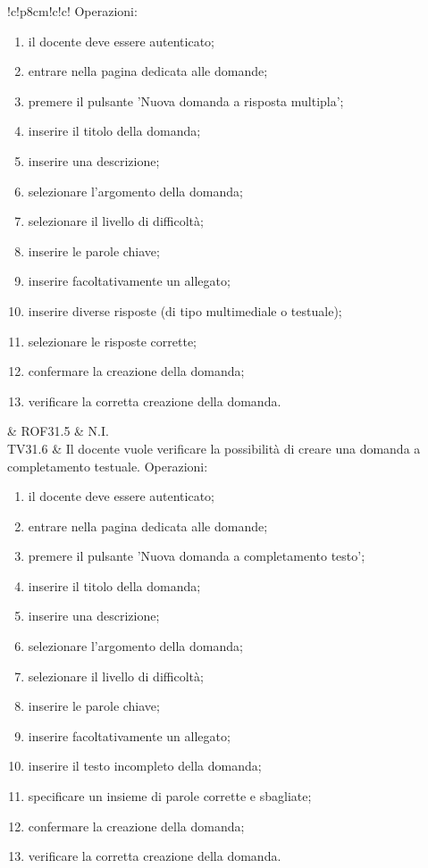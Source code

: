 \documentclass[a4paper, titlepage]{article}
\begin{document}
\begin{tabella}{!{\VRule}c!{\VRule}p{8cm}!{\VRule}c!{\VRule}c!{\VRule}}
		Operazioni:
		{\begin{enumerate}
				\item il docente deve essere autenticato;				  
				\item entrare nella pagina dedicata alle domande;
				\item premere il pulsante 'Nuova domanda a risposta multipla';
				\item inserire il titolo della domanda;
				\item inserire una descrizione;
				\item selezionare l’argomento della domanda;
				\item selezionare il livello di difficoltà;
				\item inserire le parole chiave;
				\item inserire facoltativamente un allegato;
				\item inserire diverse risposte (di tipo multimediale o testuale);
				\item selezionare le risposte corrette;
				\item confermare la creazione della domanda;
				\item verificare la corretta creazione della domanda.
		\end{enumerate}
		}
	& ROF31.5 & N.I.
	\\
	TV31.6 &
		Il docente vuole verificare la possibilità di creare una domanda a completamento testuale.
		\newline \newline
		Operazioni:
		{\begin{enumerate}
				\item il docente deve essere autenticato;
				\item entrare nella pagina dedicata alle domande;
				\item premere il pulsante 'Nuova domanda a completamento testo';
				\item inserire il titolo della domanda;
				\item inserire una descrizione;
				\item selezionare l’argomento della domanda;
				\item selezionare il livello di difficoltà;
				\item inserire le parole chiave;
				\item inserire facoltativamente un allegato;
				\item inserire il testo incompleto della domanda;
				\item specificare un insieme di parole corrette e sbagliate;
				\item confermare la creazione della domanda;
				\item verificare la corretta creazione della domanda.
				

\end{enumerate}}
\end{tabella}
\end{document}

